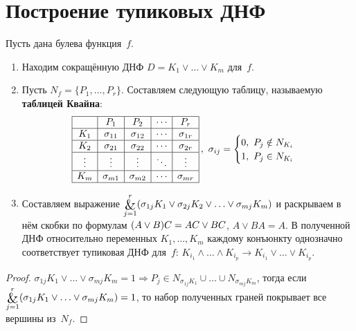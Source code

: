 \section{Построение тупиковых ДНФ}
Пусть дана булева функция~$f$.
\begin{enumerate}
	\item Находим сокращённую ДНФ $D = K_1 \lor \ldots \lor K_m$ для~$f$.
	
	\item Пусть $N_f = \{ P_1, \ldots, P_r \}$.
	 Составляем следующую таблицу, называемую \textbf{таблицей Квайна}:
	\begin{equation*}
	\begin{array}{|c|c|c|c|c|}
	\hline
	    & P_1 & P_2 & \cdots & P_r \\
    \hline
	K_1 & \sigma_{11} & \sigma_{12} & \cdots & \sigma_{1r} \\
	\hline
	K_2 & \sigma_{21} & \sigma_{22} & \cdots & \sigma_{2r} \\
	\hline
	\vdots & \vdots & \vdots & \ddots & \vdots \\
	\hline
	K_m & \sigma_{m1} & \sigma_{m2} & \cdots & \sigma_{mr} \\
	\hline
	\end{array}\,, \
	\sigma_{ij} =
	\begin{cases}
	0, \ P_j \notin N_{K_i} \\
	1, \ P_j \in N_{K_i}
	\end{cases}
	\end{equation*}
	
	\item Составляем выражение $\bigand\limits_{j=1}^r (\sigma_{1j} K_1 \lor \sigma_{2j} K_2 \lor \ldots \lor \sigma_{mj} K_m)$ и раскрываем в нём скобки по формулам $(A \lor B)C \opbr= AC \lor BC$, $A \lor BA = A$.
	В полученной ДНФ относительно переменных $K_1, \ldots, K_m$ каждому конъюнкту однозначно соответствует тупиковая ДНФ для~$f$: $K_{i_1} \land \ldots \land K_{i_p} \to K_{i_1} \lor \ldots \lor K_{i_p}$.
\end{enumerate}
\begin{proof}
$\sigma_{1j} K_1 \lor \ldots \lor \sigma_{mj} K_m = 1 \Rightarrow
P_j \in N_{\sigma_{1j} K_1} \cup \ldots \cup N_{\sigma_{mj} K_m}$, тогда если
$\bigand\limits_{j=1}^r (\sigma_{1j} K_1 \lor \ldots \lor \sigma_{mj} K_m) = 1$, то набор полученных граней покрывает все вершины из~$N_f$.
\end{proof}